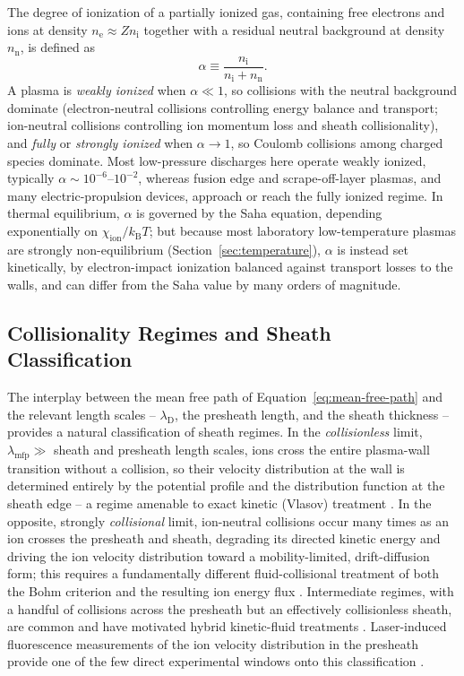 The degree of ionization of a partially ionized gas, containing free electrons and ions at density $n_{\mathrm{e}} \approx Z n_{\mathrm{i}}$ together with a residual neutral background at density $n_{\mathrm{n}}$, is defined as
\begin{equation}
\alpha \equiv \frac{n_{\mathrm{i}}}{n_{\mathrm{i}} + n_{\mathrm{n}}}.
\label{eq:ionization-degree}
\end{equation}
A plasma is \emph{weakly ionized} when $\alpha \ll 1$, so collisions with the neutral background dominate (electron-neutral collisions controlling energy balance and transport; ion-neutral collisions controlling ion momentum loss and sheath collisionality), and \emph{fully} or \emph{strongly ionized} when $\alpha \to 1$, so Coulomb collisions among charged species dominate. Most low-pressure discharges here operate weakly ionized, typically $\alpha \sim 10^{-6}$--$10^{-2}$, whereas fusion edge and scrape-off-layer plasmas, and many electric-propulsion devices, approach or reach the fully ionized regime. In thermal equilibrium, $\alpha$ is governed by the Saha equation, depending exponentially on $\chi_{\mathrm{ion}}/k_{\mathrm{B}} T$; but because most laboratory low-temperature plasmas are strongly non-equilibrium (Section~\ref{sec:temperature}), $\alpha$ is instead set kinetically, by electron-impact ionization balanced against transport losses to the walls, and can differ from the Saha value by many orders of magnitude.

\subsection{Collisionality Regimes and Sheath Classification}

The interplay between the mean free path of Equation~\eqref{eq:mean-free-path} and the relevant length scales -- $\lambda_{\mathrm{D}}$, the presheath length, and the sheath thickness -- provides a natural classification of sheath regimes. In the \emph{collisionless} limit, $\lambda_{\mathrm{mfp}} \gg$ sheath and presheath length scales, ions cross the entire plasma-wall transition without a collision, so their velocity distribution at the wall is determined entirely by the potential profile and the distribution function at the sheath edge -- a regime amenable to exact kinetic (Vlasov) treatment \cite{ref0013,ref0665}. In the opposite, strongly \emph{collisional} limit, ion-neutral collisions occur many times as an ion crosses the presheath and sheath, degrading its directed kinetic energy and driving the ion velocity distribution toward a mobility-limited, drift-diffusion form; this requires a fundamentally different fluid-collisional treatment of both the Bohm criterion and the resulting ion energy flux \cite{ref0024,ref0009}. Intermediate regimes, with a handful of collisions across the presheath but an effectively collisionless sheath, are common and have motivated hybrid kinetic-fluid treatments \cite{ref0012}. Laser-induced fluorescence measurements of the ion velocity distribution in the presheath provide one of the few direct experimental windows onto this classification \cite{ref0292}.

